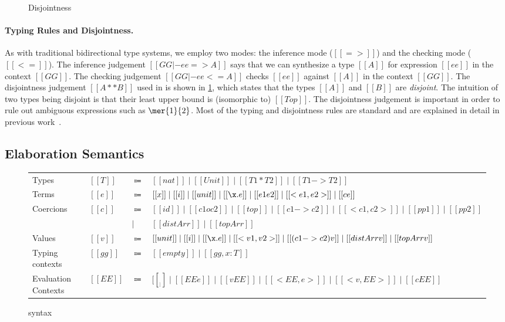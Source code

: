 \begin{figure}[t]
  \centering
  \caption{Disjointness}
  \label{fig:disjoint}
\end{figure}


\paragraph{Typing Rules and Disjointness.}

As with traditional bidirectional type systems, we employ two modes: the
inference mode ($[[=>]]$) and the checking mode ($[[<=]]$). The inference
judgement $[[GG |- ee => A]]$ says that we can synthesize a type $[[A]]$ for
expression $[[ee]]$ in the context $[[GG]]$. The checking judgement $[[GG |- ee
<= A]]$ checks $[[ee]]$ against $[[A]]$ in the context $[[GG]]$. The
disjointness judgement $[[A ** B]]$ used in  is shown in
\cref{fig:disjoint}, which states that the types $[[A]]$ and $[[B]]$ are
\textit{disjoint}. The intuition of two types being disjoint is
that their least upper bound is (isomorphic to) $[[Top]]$. The disjointness judgement is
important in order to rule out ambiguous expressions such as $\mer{1}{2}$. Most
of the typing and disjointness rules are standard and are explained in detail in
previous work~\citep{oliveira2016disjoint, alpuimdisjoint}.


\subsection{Elaboration Semantics}
\label{sec:elaboration}

\begin{figure}[t]
  \centering
\begin{tabular}{llll} \toprule
  Types & $[[T]]$ & $\Coloneqq$ & $[[nat]] \mid [[Unit]] \mid [[T1 * T2]] \mid [[T1 -> T2]] $ \\
  Terms & $[[e]]$ & $\Coloneqq$ & $[[x]] \mid [[i]] \mid [[unit]] \mid [[\x . e]] \mid [[e1 e2]] \mid [[<e1, e2>]] \mid [[c e]]$ \\
  Coercions & $[[c]]$ & $\Coloneqq$ & $ [[id]] \mid [[c1 o c2]] \mid [[top]] \mid [[c1 -> c2]] \mid [[<c1, c2>]] \mid [[pp1]] \mid [[pp2]] $ \\
  &  &  $\mid$ & $   [[distArr]] \mid [[topArr]]  $ \\
  Values & $[[v]]$ & $\Coloneqq$ & $[[unit]] \mid [[i]] \mid [[\x.e]] \mid  [[<v1, v2>]] \mid [[(c1 -> c2) v]] \mid [[distArr v]] \mid [[topArr v]] $ \\
  Typing contexts & $[[gg]]$ & $\Coloneqq$ & $[[empty]] \mid [[gg , x : T]]$ \\
  Evaluation Contexts & $[[EE]]$ & $\Coloneqq$ &  $  [[__]] \mid [[EE e]] \mid [[v EE]] \mid [[ < EE , e >  ]] \mid [[ < v , EE > ]] \mid [[ c EE  ]]$ \\ \bottomrule
\end{tabular}
  \caption{\tname syntax}
  \label{fig:target}
\end{figure}

